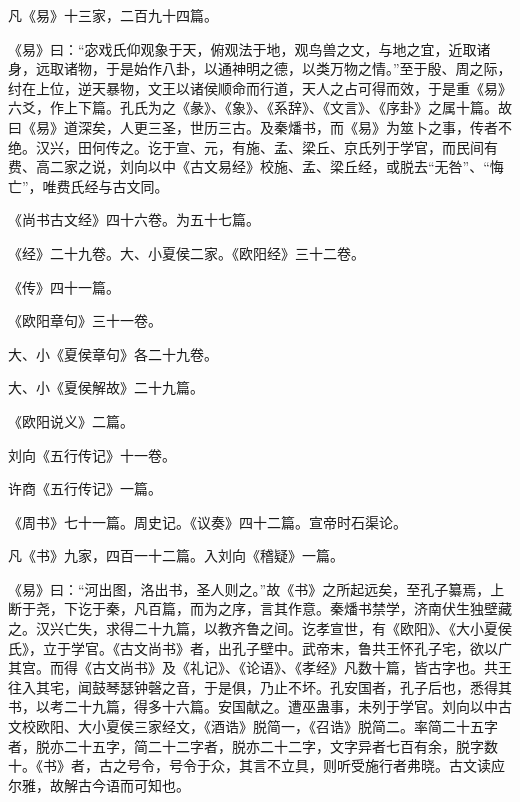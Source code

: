 \documentclass[12pt,UTF8]{ctexbook}
\begin{document}
凡《易》十三家，二百九十四篇。



《易》曰：“宓戏氏仰观象于天，俯观法于地，观鸟兽之文，与地之宜，近取诸身，远取诸物，于是始作八卦，以通神明之德，以类万物之情。”至于殷、周之际，纣在上位，逆天暴物，文王以诸侯顺命而行道，天人之占可得而效，于是重《易》六爻，作上下篇。孔氏为之《彖》、《象》、《系辞》、《文言》、《序卦》之属十篇。故曰《易》道深矣，人更三圣，世历三古。及秦燔书，而《易》为筮卜之事，传者不绝。汉兴，田何传之。讫于宣、元，有施、孟、梁丘、京氏列于学官，而民间有费、高二家之说，刘向以中《古文易经》校施、孟、梁丘经，或脱去“无咎”、“悔亡”，唯费氏经与古文同。



《尚书古文经》四十六卷。为五十七篇。



《经》二十九卷。大、小夏侯二家。《欧阳经》三十二卷。



《传》四十一篇。



《欧阳章句》三十一卷。



大、小《夏侯章句》各二十九卷。



大、小《夏侯解故》二十九篇。



《欧阳说义》二篇。



刘向《五行传记》十一卷。



许商《五行传记》一篇。



《周书》七十一篇。周史记。《议奏》四十二篇。宣帝时石渠论。



凡《书》九家，四百一十二篇。入刘向《稽疑》一篇。



《易》曰：“河出图，洛出书，圣人则之。”故《书》之所起远矣，至孔子纂焉，上断于尧，下讫于秦，凡百篇，而为之序，言其作意。秦燔书禁学，济南伏生独壁藏之。汉兴亡失，求得二十九篇，以教齐鲁之间。讫孝宣世，有《欧阳》、《大小夏侯氏》，立于学官。《古文尚书》者，出孔子壁中。武帝末，鲁共王怀孔子宅，欲以广其宫。而得《古文尚书》及《礼记》、《论语》、《孝经》凡数十篇，皆古字也。共王往入其宅，闻鼓琴瑟钟磬之音，于是俱，乃止不坏。孔安国者，孔子后也，悉得其书，以考二十九篇，得多十六篇。安国献之。遭巫蛊事，未列于学官。刘向以中古文校欧阳、大小夏侯三家经文，《酒诰》脱简一，《召诰》脱简二。率简二十五字者，脱亦二十五字，简二十二字者，脱亦二十二字，文字异者七百有余，脱字数十。《书》者，古之号令，号令于众，其言不立具，则听受施行者弗晓。古文读应尔雅，故解古今语而可知也。
\end{document}
